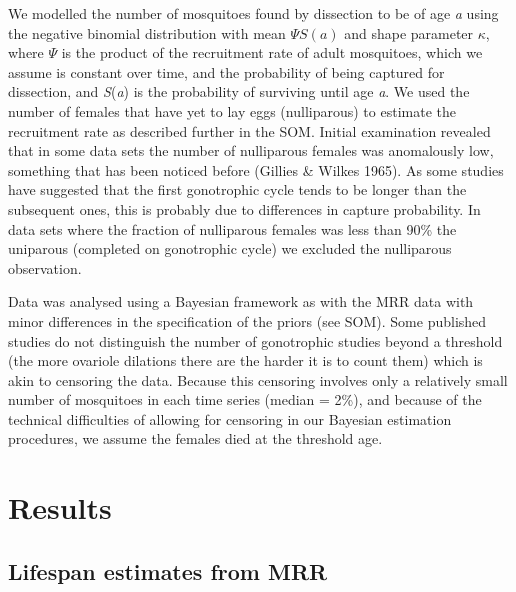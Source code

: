 \documentclass[]{article}
\begin{document}
We modelled the number of mosquitoes found by dissection to be of age
\emph{a} using the negative binomial distribution with mean
$\Psi S(a)$ and shape parameter $\kappa$, where
$\Psi$ is the product of the recruitment rate of adult mosquitoes,
which we assume is constant over time, and the probability of being
captured for dissection, and \emph{S}(\emph{a}) is the probability of
surviving until age \emph{a}. We used the number of females that have
yet to lay eggs (nulliparous) to estimate the recruitment rate as
described further in the SOM. Initial examination revealed that in some
data sets the number of nulliparous females was anomalously low,
something that has been noticed before (Gillies \& Wilkes 1965). As some
studies have suggested that the first gonotrophic cycle tends to be
longer than the subsequent ones, this is probably due to differences in
capture probability. In data sets where the fraction of nulliparous
females was less than 90\% the uniparous (completed on gonotrophic
cycle) we excluded the nulliparous observation.

Data was analysed using a Bayesian framework as with the MRR data with
minor differences in the specification of the priors (see SOM). Some
published studies do not distinguish the number of gonotrophic studies
beyond a threshold (the more ovariole dilations there are the harder it
is to count them) which is akin to censoring the data. Because this
censoring involves only a relatively small number of mosquitoes in each
time series (median = 2\%), and because of the technical difficulties of
allowing for censoring in our Bayesian estimation procedures, we assume
the females died at the threshold age.

\section{Results}\label{results}

\subsection{Lifespan estimates from
MRR}\label{lifespan-estimates-from-mrr}
\end{document}
